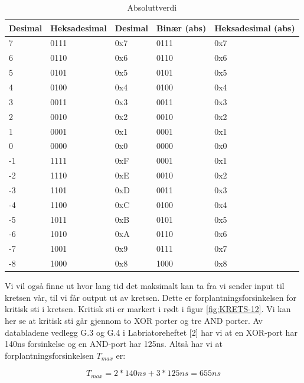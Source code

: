 \documentclass{article}
\begin{document}
\begin{table}[h]
	\centering
	\caption{Absoluttverdi}
	\label{tab:abs1}
	\vspace{0.2cm}
	\begin{tabular} {| l | l | l || l | l |} \hline
		Desimal & Heksadesimal & Desimal & Binær (abs) & Heksadesimal (abs) \\ \hline
		7 & 0111 & 0x7 & 0111 & 0x7 \\ \hline
		6 & 0110 & 0x6 & 0110 & 0x6 \\ \hline
		5 & 0101 & 0x5 & 0101 & 0x5 \\ \hline
		4 & 0100 & 0x4 & 0100 & 0x4 \\ \hline
		3 & 0011 & 0x3 & 0011 & 0x3 \\ \hline
		2 & 0010 & 0x2 & 0010 & 0x2 \\ \hline
		1 & 0001 & 0x1 & 0001 & 0x1 \\ \hline
		0 & 0000 & 0x0 & 0000 & 0x0 \\ \hline
		-1 & 1111 & 0xF & 0001 & 0x1 \\ \hline
		-2 & 1110 & 0xE & 0010 & 0x2 \\ \hline
		-3 & 1101 & 0xD & 0011 & 0x3 \\ \hline
		-4 & 1100 & 0xC & 0100 & 0x4 \\ \hline
		-5 & 1011 & 0xB & 0101 & 0x5 \\ \hline
		-6 & 1010 & 0xA & 0110 & 0x6 \\ \hline
		-7 & 1001 & 0x9 & 0111 & 0x7 \\ \hline
		-8 & 1000 & 0x8 & 1000 & 0x8 \\ \hline
	\end{tabular}
\end{table}

Vi vil også finne ut hvor lang tid det maksimalt kan ta fra vi sender input til kretsen vår, til vi får output ut av kretsen. Dette er forplantningsforsinkelsen for kritisk sti i kretsen. Kritisk sti er markert i rødt i figur \ref{fig:KRETS-12}. Vi kan her se at kritisk sti går gjennom to XOR porter og tre AND porter. Av databladene vedlegg G.3 og G.4 i Labriatoreheftet [2] har vi at en XOR-port har 140ns forsinkelse og en AND-port har 125ns. Altså har vi at forplantningsforsinkelsen \begin{math} T_{max} \end{math} er:

\begin{equation}
	T_{max} = 2 * 140ns + 3 * 125ns = 655ns
\end{equation}
\end{document}

